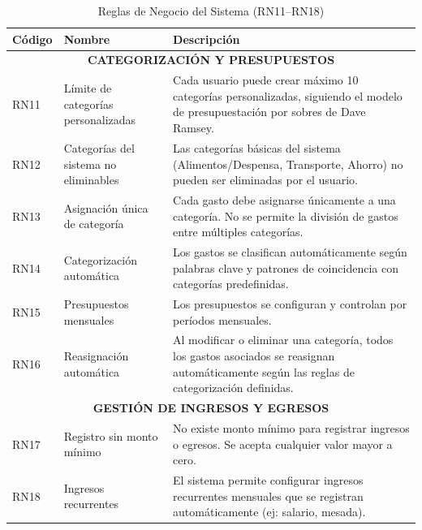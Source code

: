 \begin{table}[H]
\centering
\renewcommand{\arraystretch}{1.2}
\begin{tabularx}{\textwidth}{@{} l l X @{}}
\toprule
\textbf{Código} & \textbf{Nombre} & \textbf{Descripción} \\
\midrule

\multicolumn{3}{c}{\textbf{CATEGORIZACIÓN Y PRESUPUESTOS}} \\
\midrule

RN11 & Límite de categorías personalizadas &
Cada usuario puede crear máximo 10 categorías personalizadas, siguiendo el modelo de presupuestación por sobres de Dave Ramsey. \\

RN12 & Categorías del sistema no eliminables &
Las categorías básicas del sistema (Alimentos/Despensa, Transporte, Ahorro) no pueden ser eliminadas por el usuario. \\

RN13 & Asignación única de categoría &
Cada gasto debe asignarse únicamente a una categoría. No se permite la división de gastos entre múltiples categorías. \\

RN14 & Categorización automática &
Los gastos se clasifican automáticamente según palabras clave y patrones de coincidencia con categorías predefinidas. \\

RN15 & Presupuestos mensuales &
Los presupuestos se configuran y controlan por períodos mensuales. \\

RN16 & Reasignación automática &
Al modificar o eliminar una categoría, todos los gastos asociados se reasignan automáticamente según las reglas de categorización definidas. \\

\midrule
\multicolumn{3}{c}{\textbf{GESTIÓN DE INGRESOS Y EGRESOS}} \\
\midrule

RN17 & Registro sin monto mínimo &
No existe monto mínimo para registrar ingresos o egresos. Se acepta cualquier valor mayor a cero. \\

RN18 & Ingresos recurrentes &
El sistema permite configurar ingresos recurrentes mensuales que se registran automáticamente (ej: salario, mesada). \\

\bottomrule
\end{tabularx}
\caption{Reglas de Negocio del Sistema (RN11–RN18)}
\end{table}

